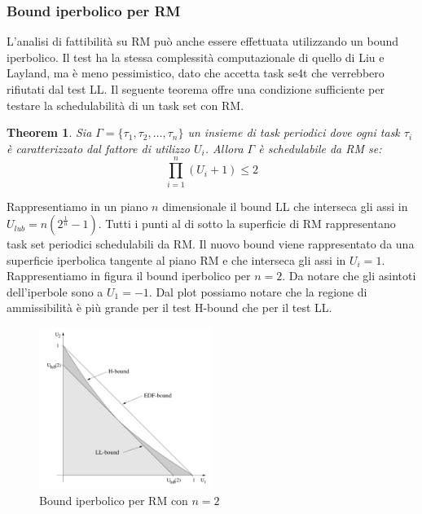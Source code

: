 \documentclass[12pt,openany,onesided]{book}
\newtheorem{theorem}{Theorem}
\begin{document}
\subsubsection{Bound iperbolico per RM}
L'analisi di fattibilità su RM può anche essere effettuata utilizzando un bound iperbolico.
Il test ha la stessa complessità computazionale di quello di Liu e Layland, ma è meno pessimistico, dato che accetta task se4t che verrebbero rifiutati dal test LL.
Il seguente teorema offre una condizione sufficiente per testare la schedulabilità di un task set con RM.
\begin{theorem}
    
    Sia $\Gamma=\{\tau_1,\tau_2,\dots,\tau_n\}$ un insieme di task periodici dove ogni task $\tau_i$ è caratterizzato dal fattore di utilizzo $U_i$. Allora $\Gamma$ è schedulabile da RM se:
    \begin{equation}
        \label{eq:boundIperbolico}
        \prod_{i=1}^{n}(U_i+1) \leq 2
    \end{equation}
\end{theorem}
Rappresentiamo in un piano $n$ dimensionale il bound LL che interseca gli assi in $U_{lub}=n(2^{\frac{1}{n}}-1)$.
Tutti i punti al di sotto la superficie di RM rappresentano task set periodici schedulabili da RM.
Il nuovo bound viene rappresentato da una superficie iperbolica tangente al piano RM e che interseca gli assi in $U_i=1$.
Rappresentiamo in figura il bound iperbolico per $n=2$. Da notare che gli asintoti dell'iperbole sono a $U_1=-1$.
Dal plot possiamo notare che la regione di ammissibilità è più grande per il test H-bound che per il test LL.
\begin{figure}[H]
    \centering
    \includegraphics[width=0.5\textwidth]{pictures/boundIperbolico.png}
    \caption{Bound iperbolico per RM con $n=2$}
\end{figure}
\end{document}

